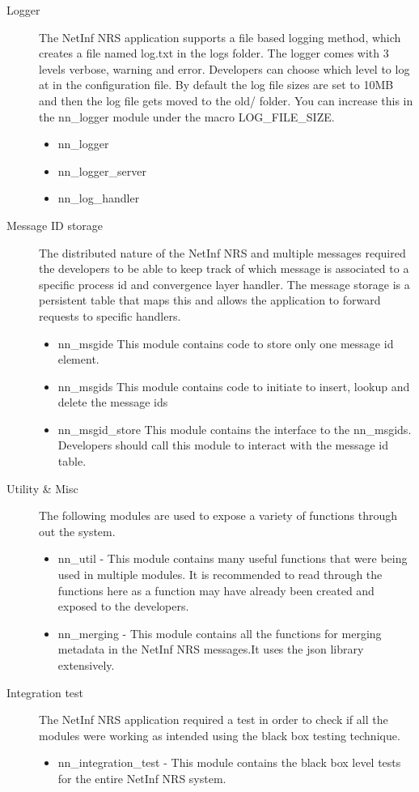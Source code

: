 \begin{description}
\item[Logger]
The NetInf NRS application supports a file based logging method, which creates a file named log.txt in the logs folder. The logger comes with 3 levels verbose, warning and error. Developers can choose which level to log at in the configuration file. By default the log file sizes are set to 10MB and then the log file gets moved to the old/ folder. You can increase this in the nn\_logger module under the macro LOG\_FILE\_SIZE.
\begin{itemize}
\item nn\_logger
\item nn\_logger\_server
\item nn\_log\_handler
\end{itemize}
\item [Message ID storage]
The distributed nature of the NetInf NRS and multiple messages required the developers to be able to keep track of which message is associated to a specific process id and convergence layer handler. The message storage is a persistent table that maps this and allows the application to forward requests to specific handlers. 
\begin{itemize}
\item nn\_msgide This module contains code to store only one message id element. 
\item nn\_msgids This module contains code to initiate to insert, lookup and delete the message ids
\item nn\_msgid\_store This module contains the interface to the nn\_msgids. Developers should call this module to interact with the message id table.
\end{itemize}
\item [Utility \& Misc]
The following modules are used to expose a variety of functions through out the system.
\begin{itemize}
\item nn\_util - This module contains many useful functions that were being used in multiple modules. It is recommended to read through the functions here as a function may have already been created and exposed to the developers.
\item nn\_merging - This module contains all the functions for merging metadata in the NetInf NRS messages.It uses the json library extensively.
\end {itemize}
\item [Integration test]
The NetInf NRS application required a test in order to check if all the modules were working as intended using the black box testing technique. 
\begin{itemize}
\item nn\_integration\_test - This module contains the black box level tests for the entire NetInf NRS system.
\end{itemize}


\end{description}

